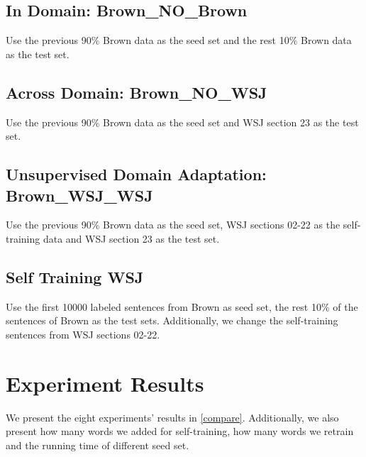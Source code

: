 \documentclass[journal, a4paper]{IEEEtran}
\begin{document}
\subsection{In Domain: Brown\_NO\_Brown}
Use the previous 90\% Brown data as the seed set and the rest 10\% Brown data as the test set.

\subsection{Across Domain: Brown\_NO\_WSJ}
Use the previous 90\% Brown data as the seed set and WSJ section 23 as the test set.

\subsection{Unsupervised Domain Adaptation: Brown\_WSJ\_WSJ}
Use the previous 90\% Brown data as the seed set, WSJ sections 02-22 as the self-training data and WSJ section 23 as the test set.

\subsection{Self Training WSJ}
Use the first 10000 labeled sentences from Brown as seed set, the rest 10\% of the sentences of Brown as the test sets. Additionally, we change the self-training sentences from WSJ sections 02-22.

\section{Experiment Results}\label{result}

We present the eight experiments' results in \ref{compare}. Additionally, we also present how many words we added for self-training, how many words we retrain and the running time of different seed set.
\end{document}
